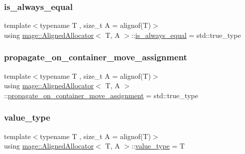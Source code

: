 \subsubsection{\texorpdfstring{is\+\_\+always\+\_\+equal}{is\_always\_equal}}
{\footnotesize\ttfamily template$<$typename T , size\+\_\+t A = alignof(\+T)$>$ \\
using \mbox{\hyperlink{classmage_1_1_aligned_allocator}{mage\+::\+Aligned\+Allocator}}$<$ T, A $>$\+::\mbox{\hyperlink{classmage_1_1_aligned_allocator_a144fbbf7d538636d83b3eb45965af6bf}{is\+\_\+always\+\_\+equal}} =  std\+::true\+\_\+type}

\mbox{\label{classmage_1_1_aligned_allocator_a810022ca5c53154ee0903a8f236b3395}} 
\subsubsection{\texorpdfstring{propagate\+\_\+on\+\_\+container\+\_\+move\+\_\+assignment}{propagate\_on\_container\_move\_assignment}}
{\footnotesize\ttfamily template$<$typename T , size\+\_\+t A = alignof(\+T)$>$ \\
using \mbox{\hyperlink{classmage_1_1_aligned_allocator}{mage\+::\+Aligned\+Allocator}}$<$ T, A $>$\+::\mbox{\hyperlink{classmage_1_1_aligned_allocator_a810022ca5c53154ee0903a8f236b3395}{propagate\+\_\+on\+\_\+container\+\_\+move\+\_\+assignment}} =  std\+::true\+\_\+type}

\mbox{\label{classmage_1_1_aligned_allocator_a9e7c440f52f940161bd6cbf1b3c1d21c}} 
\subsubsection{\texorpdfstring{value\+\_\+type}{value\_type}}
{\footnotesize\ttfamily template$<$typename T , size\+\_\+t A = alignof(\+T)$>$ \\
using \mbox{\hyperlink{classmage_1_1_aligned_allocator}{mage\+::\+Aligned\+Allocator}}$<$ T, A $>$\+::\mbox{\hyperlink{classmage_1_1_aligned_allocator_a9e7c440f52f940161bd6cbf1b3c1d21c}{value\+\_\+type}} =  T}

